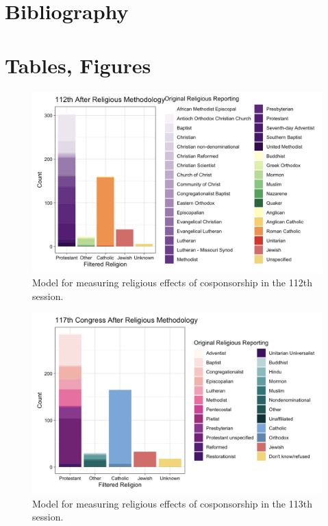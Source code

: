 \documentclass[Royal,times,sageh]{sagej}
\begin{document}
\hypertarget{bibliography}{%
\section{Bibliography}\label{bibliography}}

\hypertarget{tables-figures}{%
\section{Tables, Figures}\label{tables-figures}}

\begin{figure}

{\centering \includegraphics[width=0.7\linewidth]{images/112th_religious} 

}

\caption{Model for measuring religious effects of cosponsorship in the 112th session.\label{table1}}\label{fig:table1}
\end{figure}

\begin{figure}

{\centering \includegraphics[width=0.7\linewidth]{images/117th religious} 

}

\caption{Model for measuring religious effects of cosponsorship in the 113th session. \label{table2}}\label{fig:table2}
\end{figure}
\end{document}
